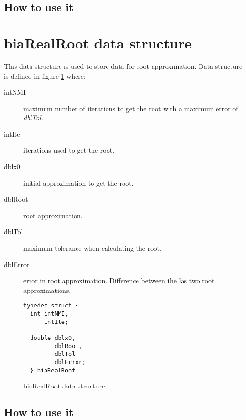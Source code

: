 \subsection{How to use it}

\section{\textbf{biaRealRoot} data structure} \label{sec:biaRealRoot}

This data structure is used to store data for root approximation. Data structure is defined in figure \ref{fig:biaRealRoot} where:

\begin{description}
\item[intNMI] maximum number of iterations to get the root with a maximum error of \emph{dblTol}.
\item[intIte] iterations used to get the root.
\item[dblx0] initial approximation to get the root.
\item[dblRoot] root approximation.
\item[dblTol] maximum tolerance when calculating the root.
\item[dblError] error in root approximation. Difference between the las two root approximations.
\end{description}

\begin{figure}[!h]
\begin{verbatim}
typedef struct {
  int intNMI,
      intIte;

  double dblx0,
         dblRoot,
         dblTol,
         dblError;
  } biaRealRoot;
\end{verbatim}
\caption{biaRealRoot data structure.} \label{fig:biaRealRoot}
\end{figure}

\FloatBarrier

\subsection{How to use it}
